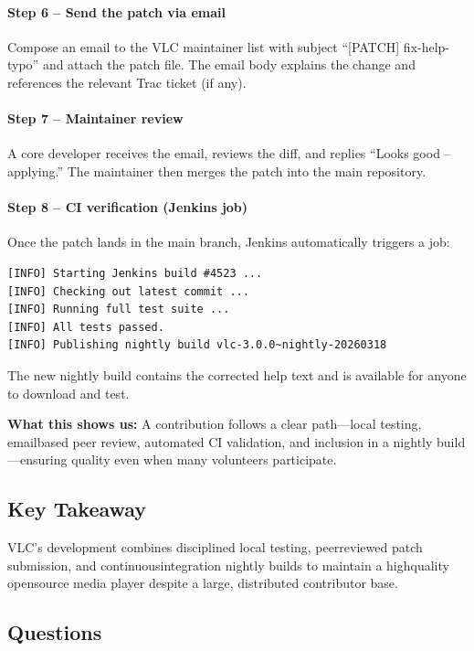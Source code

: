 \documentclass[12pt, a4paper]{article}
\begin{document}
\paragraph{Step 6 -- Send the patch via email}
Compose an email to the VLC maintainer list with subject ``[PATCH] fix-help-typo'' and attach the patch file. The email body explains the change and references the relevant Trac ticket (if any).

\paragraph{Step 7 -- Maintainer review}
A core developer receives the email, reviews the diff, and replies ``Looks good -- applying.'' The maintainer then merges the patch into the main repository.

\paragraph{Step 8 -- CI verification (Jenkins job)}
Once the patch lands in the main branch, Jenkins automatically triggers a job:
\begin{verbatim}
[INFO] Starting Jenkins build #4523 ...
[INFO] Checking out latest commit ...
[INFO] Running full test suite ...
[INFO] All tests passed.
[INFO] Publishing nightly build vlc-3.0.0~nightly-20260318
\end{verbatim}
The new nightly build contains the corrected help text and is available for anyone to download and test.

\textbf{What this shows us:} A contribution follows a clear path---local testing, emailbased peer review, automated CI validation, and inclusion in a nightly build---ensuring quality even when many volunteers participate.

\subsection{Key Takeaway}
VLC's development combines disciplined local testing, peerreviewed patch submission, and continuousintegration nightly builds to maintain a highquality opensource media player despite a large, distributed contributor base.

\subsection*{Questions}

\newpage{}
\end{document}
